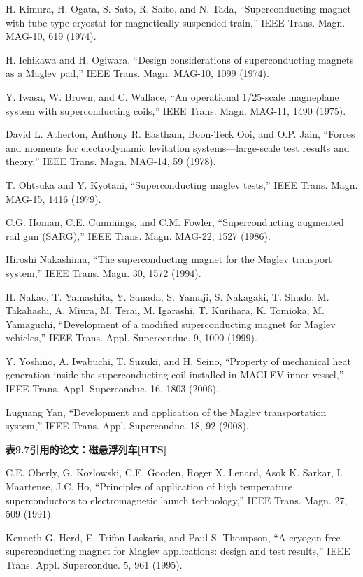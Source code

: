 \noindent [9.238] H. Kimura, H. Ogata, S. Sato, R. Saito, and N. Tada, ``Superconducting magnet
with tube-type cryostat for magnetically suspended train,” IEEE Trans. Magn.
MAG-10, 619 (1974).

\noindent [9.239] H. Ichikawa and H. Ogiwara, ``Design considerations of superconducting magnets
as a Maglev pad,” IEEE Trans. Magn. MAG-10, 1099 (1974).

\noindent [9.240] Y. Iwasa, W. Brown, and C. Wallace, ``An operational 1/25-scale magneplane
system with superconducting coils,” IEEE Trans. Magn. MAG-11, 1490 (1975).

\noindent [9.241] David L. Atherton, Anthony R. Eastham, Boon-Teck Ooi, and O.P. Jain, ``Forces
and moments for electrodynamic levitation systems—large-scale test results and
theory,” IEEE Trans. Magn. MAG-14, 59 (1978).

\noindent [9.242] T. Ohtsuka and Y. Kyotani, ``Superconducting maglev tests,” IEEE Trans. Magn.
MAG-15, 1416 (1979).

\noindent [9.243] C.G. Homan, C.E. Cummings, and C.M. Fowler, ``Superconducting augmented
rail gun (SARG),” IEEE Trans. Magn. MAG-22, 1527 (1986).

\noindent [9.244] Hiroshi Nakashima, ``The superconducting magnet for the Maglev transport system,”
IEEE Trans. Magn. 30, 1572 (1994).

\noindent [9.245] H. Nakao, T. Yamashita, Y. Sanada, S. Yamaji, S. Nakagaki, T. Shudo, M. Takahashi,
A. Miura, M. Terai, M. Igarashi, T. Kurihara, K. Tomioka, M. Yamaguchi,
``Development of a modified superconducting magnet for Maglev vehicles,” IEEE
Trans. Appl. Superconduc. 9, 1000 (1999).

\noindent [9.246] Y. Yoshino, A. Iwabuchi, T. Suzuki, and H. Seino, ``Property of mechanical heat
generation inside the superconducting coil installed in MAGLEV inner vessel,”
IEEE Trans. Appl. Superconduc. 16, 1803 (2006).

\noindent [9.247] Luguang Yan, ``Development and application of the Maglev transportation system,”
IEEE Trans. Appl. Superconduc. 18, 92 (2008).

\noindent \textbf{表9.7引用的论文：磁悬浮列车[HTS] }

\noindent [9.248] C.E. Oberly, G. Kozlowski, C.E. Gooden, Roger X. Lenard, Asok K. Sarkar, I.
Maartense, J.C. Ho, ``Principles of application of high temperature superconductors
to electromagnetic launch technology,” IEEE Trans. Magn. 27, 509 (1991).

\noindent [9.249] Kenneth G. Herd, E. Trifon Laskaris, and Paul S. Thompson, ``A cryogen-free
superconducting magnet for Maglev applications: design and test results,” IEEE
Trans. Appl. Superconduc. 5, 961 (1995).


